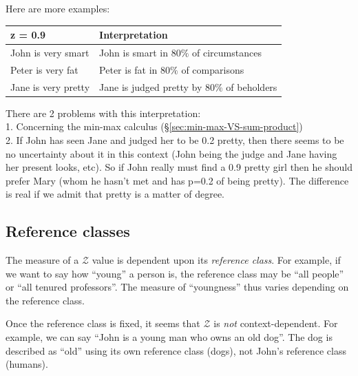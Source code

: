 Here are more examples:\\
\hspace*{1cm} \begin{tabular}{|l|l|} \hline
\textbf{z = 0.9}             & \textbf{Interpretation}\\ \hline
John is very smart           & John is smart in $80\%$ of circumstances\\ \hline
Peter is very fat            & Peter is fat in $80\%$ of comparisons\\ \hline
Jane is very pretty          & Jane is judged pretty by $80\%$ of beholders\\ \hline
\end{tabular}

%

There are 2 problems with this interpretation:\\
1.  Concerning the min-max calculus (\S\ref{sec:min-max-VS-sum-product})\\
2.  If John has seen Jane and judged her to be 0.2 pretty, then there seems to be no uncertainty about it in this context (John being the judge and Jane having her present looks, etc).  So if John really must find a 0.9 pretty girl then he should prefer Mary (whom he hasn't met and has p=0.2 of being pretty).  The difference is real if we admit that pretty is a matter of degree.

\subsection{Reference classes}

The measure of a $\mathcal{Z}$ value is dependent upon its \textit{reference class}.  For example, if we want to say how ``young'' a person is, the reference class may be ``all people'' or ``all tenured professors''.  The measure of ``youngness'' thus varies depending on the reference class.

Once the reference class is fixed, it seems that $\mathcal{Z}$ is \textit{not} context-dependent.  For example, we can say ``John is a young man who owns an old dog''.  The dog is described as ``old'' using its own reference class (dogs), not John's reference class (humans).

